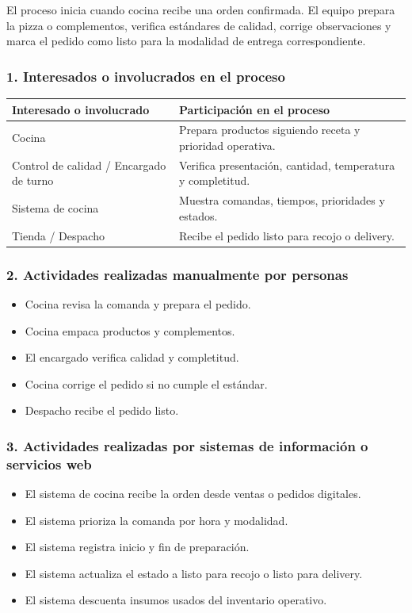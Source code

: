 \documentclass[a4paper,12pt]{article}
\begin{document}
El proceso inicia cuando cocina recibe una orden confirmada. El equipo prepara la pizza o complementos, verifica estándares de calidad, corrige observaciones y marca el pedido como listo para la modalidad de entrega correspondiente.

\subsubsection*{1. Interesados o involucrados en el proceso}

\begin{longtable}{P{5cm} P{9cm}}
\toprule
\textbf{Interesado o involucrado} & \textbf{Participación en el proceso} \\
\midrule
Cocina & Prepara productos siguiendo receta y prioridad operativa. \\
Control de calidad / Encargado de turno & Verifica presentación, cantidad, temperatura y completitud. \\
Sistema de cocina & Muestra comandas, tiempos, prioridades y estados. \\
Tienda / Despacho & Recibe el pedido listo para recojo o delivery. \\
\bottomrule
\end{longtable}

\subsubsection*{2. Actividades realizadas manualmente por personas}

\begin{itemize}
    \item Cocina revisa la comanda y prepara el pedido.
    \item Cocina empaca productos y complementos.
    \item El encargado verifica calidad y completitud.
    \item Cocina corrige el pedido si no cumple el estándar.
    \item Despacho recibe el pedido listo.
\end{itemize}

\subsubsection*{3. Actividades realizadas por sistemas de información o servicios web}

\begin{itemize}
    \item El sistema de cocina recibe la orden desde ventas o pedidos digitales.
    \item El sistema prioriza la comanda por hora y modalidad.
    \item El sistema registra inicio y fin de preparación.
    \item El sistema actualiza el estado a listo para recojo o listo para delivery.
    \item El sistema descuenta insumos usados del inventario operativo.
\end{itemize}
\end{document}

